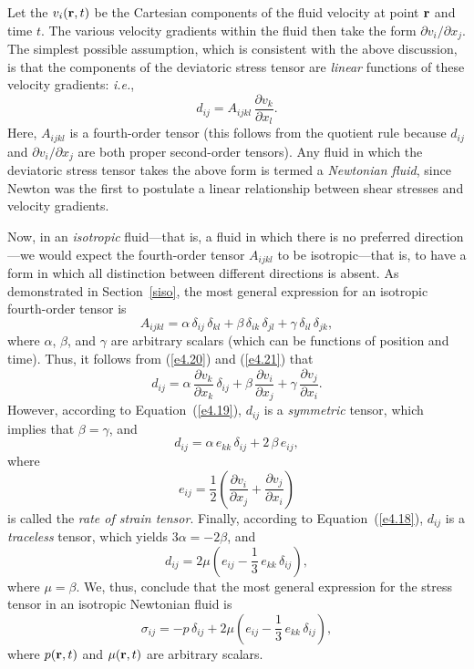 Let the $v_i({\bf r}, t)$ be the Cartesian components of the fluid velocity at point ${\bf r}$ and time $t$. The
various velocity gradients within the fluid then take the form $\partial v_i/\partial x_j$. The simplest
possible assumption, which is consistent with the above discussion,  is that the components of the deviatoric stress tensor are {\em linear}\/ functions
of these velocity gradients: {\em i.e.}, 
\begin{equation}\label{e4.20}
d_{ij} = A_{ijkl}\,\frac{\partial v_k}{\partial x_l}.
\end{equation}
Here, $A_{ijkl}$ is a fourth-order tensor (this follows from the quotient rule because $d_{ij}$ and
$\partial v_i/\partial x_j$ are both proper second-order tensors). Any fluid in which the deviatoric
stress tensor takes the above form is termed a {\em Newtonian fluid}, since Newton was the
first to postulate a linear relationship between shear stresses and velocity gradients.  

Now, in an {\em isotropic}\/ fluid---that is, a fluid in which there is no preferred direction---we would
expect the fourth-order tensor $A_{ijkl}$ to be isotropic---that is, to have a form in which all
distinction between different directions is absent. As demonstrated in Section~\ref{siso}, the
most general expression for  an isotropic fourth-order tensor  is
\begin{equation}\label{e4.21}
A_{ijkl}= \alpha\,\delta_{ij}\,\delta_{kl} + \beta\,\delta_{ik}\,\delta_{jl}+\gamma\,\delta_{il}\,\delta_{jk},
\end{equation}
where $\alpha$, $\beta$, and $\gamma$ are arbitrary scalars (which can be functions of position and time). 
Thus, it follows from (\ref{e4.20}) and (\ref{e4.21}) that
\begin{equation}
d_{ij} = \alpha\,\frac{\partial v_k}{\partial x_k}\,\delta_{ij} + \beta\,\frac{\partial v_i}{\partial x_j}
+\gamma\,\frac{\partial v_j}{\partial x_i}.
\end{equation}
However, according to Equation~(\ref{e4.19}), $d_{ij}$ is a {\em symmetric}\/ tensor, which implies that $\beta=\gamma$, 
and
\begin{equation}
d_{ij} = \alpha\,e_{kk}\,\delta_{ij}+2\,\beta\,e_{ij},
\end{equation}
where
\begin{equation}\label{e4.24}
e_{ij} = \frac{1}{2}\left(\frac{\partial v_i}{\partial x_j} + \frac{\partial v_j}{\partial x_i}\right)
\end{equation}
is called the {\em rate of strain tensor}. 
Finally, according to Equation~(\ref{e4.18}), $d_{ij}$ is a {\em traceless}\/ tensor, which yields 
$3\alpha=-2\beta$, and
\begin{equation}\label{e4.25}
d_{ij} = 2\mu\left(e_{ij} - \frac{1}{3}\,e_{kk}\,\delta_{ij}\right),
\end{equation}
where $\mu=\beta$. 
We, thus, conclude that  the most general expression for the stress tensor in an isotropic Newtonian fluid
is
\begin{equation}\label{e4.26}
\sigma_{ij} = - p\,\delta_{ij} +2\mu\left(e_{ij} - \frac{1}{3}\,e_{kk}\,\delta_{ij}\right),
\end{equation}
where $p({\bf r},t)$ and $\mu({\bf r},t)$ are arbitrary scalars. 

